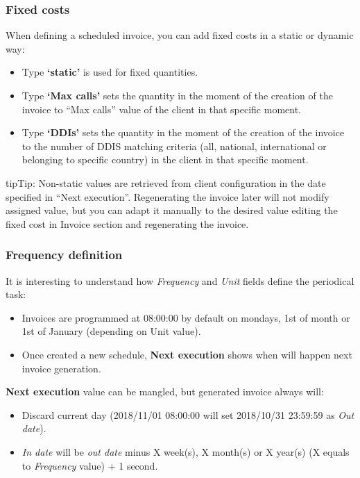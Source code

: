 \documentclass[letterpaper,10pt,english]{sphinxmanual}
\begin{document}
\subsubsection{Fixed costs}
\label{administration_portal/brand/invoicing/invoice_schedulers:fixed-costs}
When defining a scheduled invoice, you can add fixed costs in a static or dynamic way:
\begin{itemize}
\item {} 
Type \textbf{`static'} is used for fixed quantities.

\item {} 
Type \textbf{`Max calls'} sets the quantity in the moment of the creation of the invoice to
``Max calls'' value of the client in that specific moment.

\item {} 
Type \textbf{`DDIs'} sets the quantity in the moment of the creation of the invoice to
the number of DDIS matching criteria (all, national, international or belonging to specific country)
in the client in that specific moment.

\end{itemize}

\begin{notice}{tip}{Tip:}
Non-static values are retrieved from client configuration in the date specified in ``Next execution''.
Regenerating the invoice later will not modify assigned value, but you can adapt it manually to
the desired value editing the fixed cost in Invoice section and regenerating the invoice.
\end{notice}


\subsubsection{Frequency definition}
\label{administration_portal/brand/invoicing/invoice_schedulers:frequency-definition}
It is interesting to understand how \emph{Frequency} and \emph{Unit} fields define the periodical task:
\begin{itemize}
\item {} 
Invoices are programmed at 08:00:00 by default on mondays, 1st of month or 1st of January (depending on Unit value).

\item {} 
Once created a new schedule, \textbf{Next execution} shows when will happen next invoice generation.

\end{itemize}

\textbf{Next execution} value can be mangled, but generated invoice always will:
\begin{itemize}
\item {} 
Discard current day (2018/11/01 08:00:00 will set 2018/10/31 23:59:59 as \emph{Out date}).

\item {} 
\emph{In date} will be \emph{out date} minus X week(s), X month(s) or X year(s) (X equals to \emph{Frequency} value) + 1 second.

\end{itemize}
\end{document}
